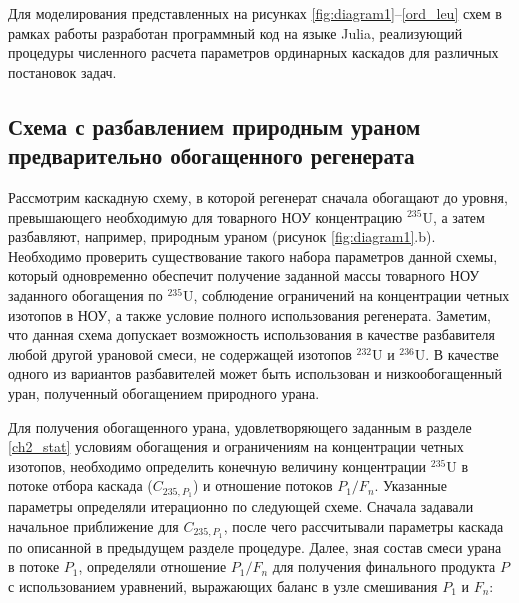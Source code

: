 Для моделирования представленных на рисунках \ref{fig:diagram1}--\ref{ord_leu} схем в рамках работы разработан программный код на языке Julia, реализующий процедуры численного расчета параметров ординарных каскадов для различных постановок задач.

\subsection{Схема с разбавлением природным ураном предварительно обогащенного регенерата}

Рассмотрим каскадную схему, в которой регенерат сначала обогащают до уровня, превышающего необходимую для товарного НОУ концентрацию $^{235}$U, а затем разбавляют, например, природным ураном (рисунок \ref{fig:diagram1}.b). Необходимо проверить существование такого набора параметров данной схемы, который одновременно обеспечит получение заданной массы товарного НОУ заданного обогащения по $^{235}$U, соблюдение ограничений на концентрации четных изотопов в НОУ, а также условие полного использования регенерата. Заметим, что данная схема допускает возможность использования в качестве разбавителя любой другой урановой смеси, не содержащей изотопов $^{232}$U и $^{236}$U. В качестве одного из вариантов разбавителей может быть использован и низкообогащенный уран, полученный обогащением природного урана.


Для получения обогащенного урана, удовлетворяющего заданным в разделе \ref{ch2_stat} условиям обогащения и ограничениям на концентрации четных изотопов, необходимо определить конечную величину концентрации $^{235}$U в потоке отбора каскада ($C_{235, P_1}$) и отношение потоков ${P_1}{/}{F_n}$. Указанные параметры определяли итерационно по следующей схеме. Сначала задавали начальное приближение для $C_{235, P_1}$, после чего рассчитывали параметры каскада по описанной в предыдущем разделе процедуре. Далее, зная состав смеси урана в потоке $P_1$, определяли отношение ${P_1}{/}{F_n}$ для получения финального продукта $P$ с использованием уравнений, выражающих баланс в узле смешивания $P_1$ и $F_n$:

